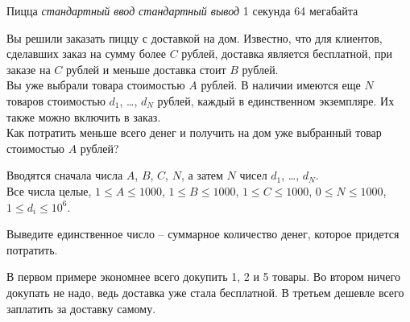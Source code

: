 \begin{problem}%
{Пицца}%
{\textsl{стандартный ввод}}%
{\textsl{стандартный вывод}}%
{1 секунда}%
{64 мегабайта}{}

Вы решили заказать пиццу с доставкой на дом. Известно, что для клиентов, сделавших заказ на сумму более $C$ рублей, доставка является бесплатной, при заказе на $C$ рублей и меньше доставка стоит $B$ рублей.\\

Вы уже выбрали товара стоимостью $A$ рублей. В наличии имеются еще $N$ товаров стоимостью $d_1$, \dots, $d_N$ рублей, каждый в единственном экземпляре. Их также можно включить в заказ.\\

Как потратить меньше всего денег и получить на дом уже выбранный товар стоимостью $A$ рублей?

\InputFile

Вводятся сначала числа $A$, $B$, $C$, $N$, а затем $N$ чисел $d_1$, \dots, $d_N$.\\

Все числа целые, $1 \le A \le 1000$, $1 \le B \le 1000$, $1 \le C \le 1000$, $0 \le N \le 1000$, $1 \le d_i \le 10^6$.

\OutputFile

Выведите единственное число – суммарное количество денег, которое придется потратить.

\Examples

\begin{example}
%
%
%
\end{example}

\Explanation

В первом примере экономнее всего докупить 1, 2 и 5 товары. Во втором ничего докупать не надо, ведь доставка уже стала бесплатной. В третьем дешевле всего заплатить за доставку самому.

\end{problem}